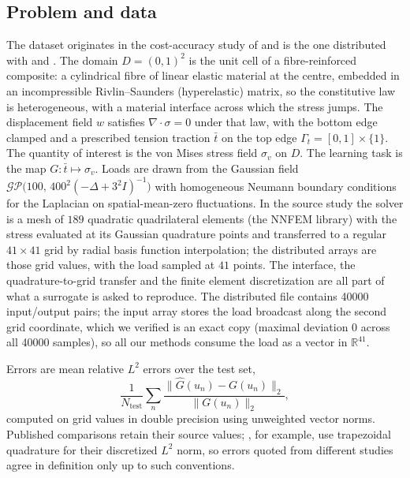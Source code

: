 \subsection{Problem and data}
The dataset originates in the cost-accuracy study of \citet{dehoop2022cost}
and is the one distributed with \citet{batlle2024kernel} and
\citet{mora2025operator}. The domain $D=(0,1)^2$ is the unit cell of a
fibre-reinforced composite: a cylindrical fibre of linear elastic material at
the centre, embedded in an incompressible Rivlin--Saunders (hyperelastic)
matrix, so the constitutive law is heterogeneous, with a material interface
across which the stress jumps. The displacement field $w$ satisfies
$\nabla\cdot\sigma=0$ under that law, with the bottom edge clamped and a
prescribed tension traction $\bar t$ on the top edge
$\Gamma_t=[0,1]\times\{1\}$. The quantity of interest is the von Mises
stress field $\sigma_v$ on $D$. The learning task is
the map $G:\bar t\mapsto\sigma_v$. Loads are drawn from the Gaussian field
$\mathcal{GP}\big(100,\,400^2(-\Delta+3^2 I)^{-1}\big)$ with homogeneous
Neumann boundary conditions for the Laplacian on spatial-mean-zero
fluctuations. In the source study the
solver is a mesh of $189$ quadratic quadrilateral elements (the NNFEM
library) with the stress evaluated at its Gaussian quadrature points and
transferred to a regular $41\times41$ grid by radial basis function
interpolation; the distributed arrays are those grid values, with the load
sampled at $41$ points. The interface, the quadrature-to-grid transfer and the
finite element discretization are all part of what a surrogate is asked to
reproduce. The distributed file contains 40000 input/output pairs; the
input array stores the load broadcast along the second grid coordinate, which
we verified is an exact copy (maximal deviation $0$ across all 40000
samples), so all our methods consume the load as a vector in $\mathbb R^{41}$.

Errors are mean relative $L^2$ errors over the test set,
\[
\frac1{N_{\mathrm{test}}}\sum_{n}\frac{\|\widehat
G(u_n)-G(u_n)\|_2}{\|G(u_n)\|_2},
\]
computed on grid values in double precision using unweighted vector norms.
Published comparisons retain their source values; \citet{batlle2024kernel},
for example, use trapezoidal quadrature for their discretized $L^2$ norm, so
errors quoted from different studies agree in definition only up to such
conventions.

